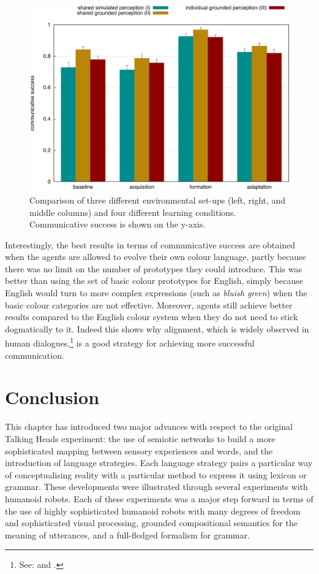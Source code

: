 \begin{figure}[htbp]
  \centerline{\includegraphics[width=.9\textwidth]{chap11/figs/grounding-comparison.pdf}}
\caption{Comparison of three different environmental set-ups (left, right, and middle columns)
and four different learning conditions. Communicative success is shown on the y-axis.}
\label{fig:grounding-comparison} 
\end{figure}

Interestingly, the best results in terms of communicative success
are obtained when the agents are allowed to evolve their own colour language, 
partly because there was no limit on the number of prototypes they could introduce. This was better 
than using the set of basic colour prototypes for English, simply because English would turn to more complex expressions
(such as \textit{bluish green}) when the basic colour categories are not effective. Moreover, 
agents still achieve better results compared to the English colour system when they do not need to stick 
dogmatically to it. Indeed this shows why alignment, which is widely observed
in human dialogues,\footnote{See: \cite{Garrod:1987} and \cite{Galantucci:2005}.}
is a good strategy for achieving more successful communication.

\section{Conclusion}

This chapter has introduced two major advances with respect to the original Talking Heads experiment: 
the use of semiotic networks to build a more sophisticated mapping between sensory experiences and words, and the 
introduction of language strategies. Each language strategy pairs a particular way of conceptualising reality 
with a particular method to express it using lexicon or grammar. 
These developments were illustrated through several experiments with humanoid robots. Each of these experiments 
was a major step forward in terms of the use of 
highly sophisticated humanoid robots with many degrees of freedom and sophisticated visual processing, grounded compositional 
semantics for the meaning of utterances, and a full-fledged formalism for grammar. 



